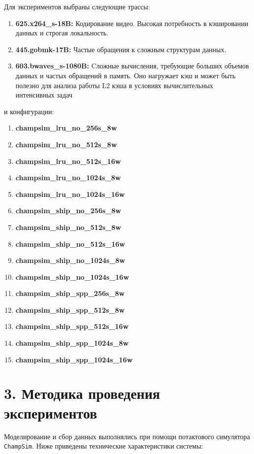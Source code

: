 \documentclass[11pt,a4paper]{article}
\begin{document}
Для экспериментов выбраны следующие трассы:
\begin{enumerate}
    \item \textbf{625.x264\_s-18B:} Кодирование видео. Высокая потребность в кэшировании данных и строгая локальность.
    \item \textbf{445.gobmk-17B:} Частые обращения к сложным структурам данных.
    \item \textbf{603.bwaves\_s-1080B:} Cложные вычисления, требующие больших объемов
данных и частых обращений в память. Оно нагружает кэш и может быть полезно
для анализа работы L2 кэша в условиях вычислительных интенсивных задач
\end{enumerate}

и конфигурации:
\begin{enumerate}
    \item \textbf{champsim\_lru\_no\_256s\_8w}    
    \item \textbf{champsim\_lru\_no\_512s\_8w}    
    \item \textbf{champsim\_lru\_no\_512s\_16w}   
    \item \textbf{champsim\_lru\_no\_1024s\_8w}   
    \item \textbf{champsim\_lru\_no\_1024s\_16w}  
    \item \textbf{champsim\_ship\_no\_256s\_8w}    
    \item \textbf{champsim\_ship\_no\_512s\_8w}    
    \item \textbf{champsim\_ship\_no\_512s\_16w}   
    \item \textbf{champsim\_ship\_no\_1024s\_8w}   
    \item \textbf{champsim\_ship\_no\_1024s\_16w}  
    \item \textbf{champsim\_ship\_spp\_256s\_8w}
    \item \textbf{champsim\_ship\_spp\_512s\_8w}
    \item \textbf{champsim\_ship\_spp\_512s\_16w}
    \item \textbf{champsim\_ship\_spp\_1024s\_8w}
    \item \textbf{champsim\_ship\_spp\_1024s\_16w}
\end{enumerate}

\section*{3. Методика проведения экспериментов}

Моделирование и сбор данных выполнялись при помощи потактового симулятора \texttt{ChampSim}. Ниже приведены технические характеристики системы:
\end{document}
